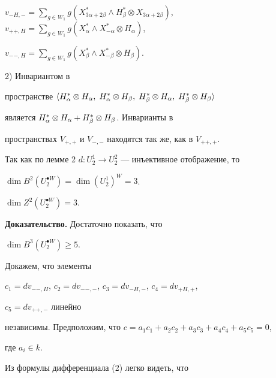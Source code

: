 \begin{pf}
$v_{-H,-}=\sum\limits_{g\in W_1}g(X^*_{3\alpha+2\beta}\wedge 


H^*_\beta\otimes X_{3\alpha+2\beta})$, $v_{++,H}=\sum\limits_{g\in 


W_1}g(X^*_\alpha\wedge X^*_{-\alpha}\otimes H_\alpha)$, 


$v_{--,H}=\sum\limits_{g\in W_1}g(X^*_\beta\wedge X^*_{-\beta}\otimes 


H_\beta)$. 


 


2) Инвариантом в 


пространстве $\langle H^*_{\a}\otimes H_{\a},\; H^{*}_{\a}\otimes 


H_{\b},\; H^{*}_{\b}\otimes H_{\a},\; H^{*}_{\b}\otimes H_{\b}\rangle$ 


является $H^*_{\alpha}\otimes H_{\alpha}+H^*_{\beta}\otimes H_{\beta}$. Инварианты в 


пространствах $V_{+,+}$ и $V_{-,-}$ находятся так же, как в $V_{++,+}$. 


\end{pf} 


 


Так как по лемме 2\; $d:U^1_2\to U^2_2$ --- инъективное отображение, то 


$\dim B^2(U^{\bullet W}_2){=}\dim (U^1_2)^W{=}3$. 


 


\begin {lem} 


$\dim Z^2(U^{\bullet W}_2)=3$. 


\end {lem} 


 


{\bf Доказательство.} Достаточно показать, что 


$\dim B^3(U^{\bullet W}_2)\ge 5$. 


Докажем, что элементы 


$c_1=dv_{--,H}$, $c_2=dv_{--,-}$, $c_3=dv_{-H,-}$, $c_4=dv_{+H,+}$, 


$c_5=dv_{++,-}$ линейно 


независимы. Предположим, что $c=a_1c_1+a_2c_2+a_3c_3+a_4c_4+a_5c_5=0$, 


где $a_i\in k$. 


Из формулы дифференциала (2) легко видеть, что 


